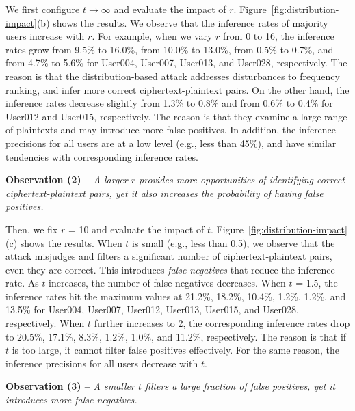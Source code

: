 We first configure $t \rightarrow \infty$ and evaluate the impact of $r$. Figure~\ref{fig:distribution-impact}(b) shows the results. We observe that the
inference rates of majority users increase with $r$. For example, when we vary
$r$ from 0 to 16, the inference rates grow from 9.5\% to 16.0\%, from 10.0\%
to 13.0\%, from 0.5\% to 0.7\%, and from 4.7\% to 5.6\% for User004, User007,
User013, and User028, respectively. The reason is that the distribution-based
attack addresses disturbances to frequency ranking, and infer more correct
ciphertext-plaintext  pairs. On the other hand, the inference rates decrease
slightly from 1.3\% to 0.8\% and from 0.6\% to 0.4\% for User012 and User015,
respectively. The reason is that they examine a large range of plaintexts and
may introduce more false positives. In addition, the inference precisions for
all users are  at a low level (e.g., less than 45\%), and have similar
tendencies with corresponding inference rates.  

{\bf Observation (2) --} {\em A larger $r$ provides more opportunities of
identifying correct ciphertext-plaintext pairs, yet it also increases the
probability of having false positives.}   

Then, we fix $r$ = 10 and evaluate the impact of $t$. 
Figure~\ref{fig:distribution-impact}(c) shows the results. When $t$ is small
(e.g., less than 0.5), we observe that the attack misjudges and filters a
significant number of ciphertext-plaintext pairs, even they are correct. This
introduces {\em false negatives} that reduce the inference rate. As $t$
increases, the number of false negatives decreases.  When $t$ = 1.5, the
inference rates hit the maximum values at 21.2\%, 18.2\%, 10.4\%, 1.2\%,
1.2\%, and 13.5\% for User004, User007, User012, User013, User015, and
User028, respectively. When $t$ further increases to 2, the corresponding
inference rates drop to 20.5\%, 17.1\%, 8.3\%, 1.2\%, 1.0\%, and 11.2\%,
respectively. The reason is that if $t$ is too large, it cannot filter false
positives effectively. For the same reason, the inference precisions for all
users decrease with $t$.  



{\bf Observation (3) --} {\em A smaller $t$ filters a large fraction of false
positives, yet it introduces more false negatives.}   


